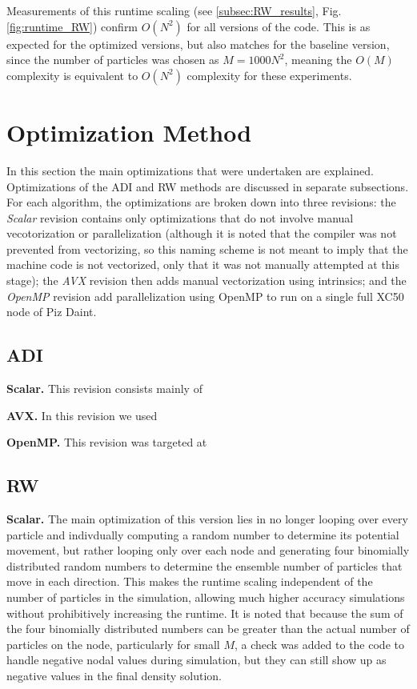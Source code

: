 \documentclass[letterpaper]{article}
\newcommand{\mypar}[1]{{\bf #1.}}
\begin{document}
Measurements of this runtime scaling (see \ref{subsec:RW_results}, Fig. \ref{fig:runtime_RW}) confirm $O(N^2)$ for all versions of the code. This is as expected for the optimized versions, but also matches for the baseline version, since the number of particles was chosen as $M=1000N^2$, meaning the $O(M)$ complexity is equivalent to $O(N^2)$ complexity for these experiments.


\section{Optimization Method}\label{sec:method}

In this section the main optimizations that were undertaken are explained. Optimizations of the ADI and RW methods are discussed in separate subsections. For each algorithm, the optimizations are broken down into three revisions: the \textit{Scalar} revision contains only optimizations that do not involve manual vecotorization or parallelization (although it is noted that the compiler was not prevented from vectorizing, so this naming scheme is not meant to imply that the machine code is not vectorized, only that it was not manually attempted at this stage); the \textit{AVX} revision then adds manual vectorization using intrinsics; and the \textit{OpenMP} revision add parallelization using OpenMP to run on a single full XC50 node of Piz Daint.

\subsection{ADI}\label{subsec:ADI_method}

\mypar{Scalar}
This revision consists mainly of 

\mypar{AVX}
In this revision we used

\mypar{OpenMP}
This revision was targeted at 


\subsection{RW}\label{subsec:RW_method}

\mypar{Scalar}
The main optimization of this version lies in no longer looping over every particle and indivdually computing a random number to determine its potential movement, but rather looping only over each node and generating four binomially distributed random numbers to determine the ensemble number of particles that move in each direction. This makes the runtime scaling independent of the number of particles in the simulation, allowing much higher accuracy simulations  without prohibitively increasing the runtime. It is noted that because the sum of the four binomially distributed numbers can be greater than the actual number of particles on the node, particularly for small $M$, a check was added to the code to handle negative nodal values during simulation, but they can still show up as negative values in the final density solution.
\end{document}
